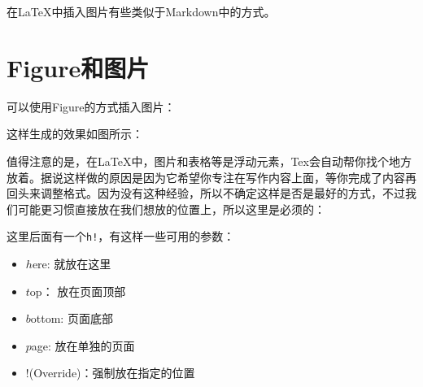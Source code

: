 \documentclass[12pt]{article}
\begin{document}
\makeblogtitle

在LaTeX中插入图片有些类似于Markdown中的方式。

\section{Figure和图片}\label{figureux548cux56feux7247}

可以使用Figure的方式插入图片：

\begin{Shaded}
\begin{Highlighting}[]
\NormalTok{\{}\NormalTok{\} }

\NormalTok{\{}\NormalTok{\}[h!]}
    \NormalTok{[width=}\NormalTok{]\{}\NormalTok{\}}
    \NormalTok{\{}\NormalTok{\}}
\NormalTok{\{}\NormalTok{\}}
\end{Highlighting}
\end{Shaded}

这样生成的效果如图所示：

值得注意的是，在LaTeX中，图片和表格等是浮动元素，Tex会自动帮你找个地方放着。据说这样做的原因是因为它希望你专注在写作内容上面，等你完成了内容再回头来调整格式。因为没有这种经验，所以不确定这样是否是最好的方式，不过我们可能更习惯直接放在我们想放的位置上，所以这里是必须的：

\begin{Shaded}
\begin{Highlighting}[]
\end{Highlighting}
\end{Shaded}

这里后面有一个\texttt{h!}，有这样一些可用的参数：

\begin{itemize}
\tightlist
\item
  \(h\)ere: 就放在这里
\item
  \(t\)op： 放在页面顶部
\item
  \(b\)ottom: 页面底部
\item
  \(p\)age: 放在单独的页面
\item
  \(!\)(Override)：强制放在指定的位置
\end{itemize}
\end{document}
